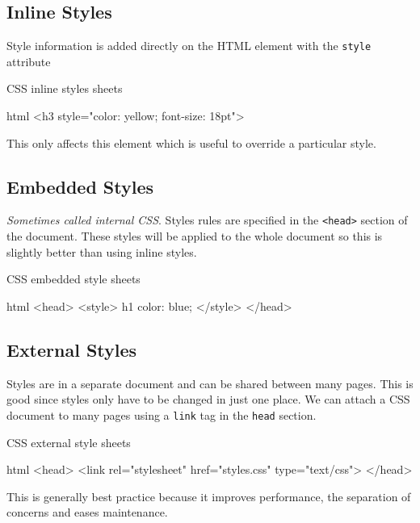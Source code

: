 \subsection{Inline Styles}\label{sub:inline_styles}

Style information is added directly on the HTML element with the \texttt{style} attribute
\begin{highlight}{CSS inline styles sheets}
    \begin{code}{html}
        <h3 style="color: yellow; font-size: 18pt">
    \end{code}
\end{highlight}
This only affects this element which is useful to override a particular style.

\subsection{Embedded Styles}\label{sub:embedded_styles}

\emph{Sometimes called internal CSS}.
Styles rules are specified in the \texttt{<head>} section of the document.
These styles will be applied to the whole document so this is slightly better than using inline styles.
\begin{highlight}{CSS embedded style sheets}
    \begin{code}{html}
        <head>
        <style>
            h1 {
                color: blue;
            }
        </style>
        </head>
    \end{code}
\end{highlight}

\subsection{External Styles}\label{sub:external_styles}

Styles are in a separate document and can be shared between many pages.
This is good since styles only have to be changed in just one place.
We can attach a CSS document to many pages using a \texttt{link} tag in the \texttt{head} section.
\begin{highlight}{CSS external style sheets}
    \begin{code}{html}
        <head>
            <link rel="stylesheet" href="styles.css" type="text/css">
        </head>
    \end{code}
\end{highlight}
This is generally best practice because it improves performance, the separation of concerns and eases maintenance.

